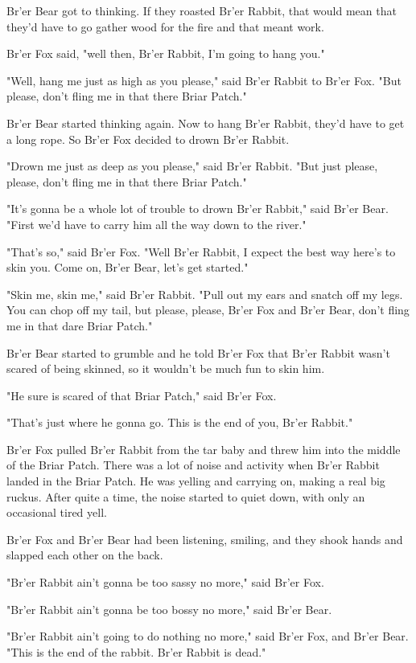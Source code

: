 Br'er Bear got to thinking. If they roasted Br'er Rabbit, that would mean that they'd have to go gather wood for the fire and that meant work.

Br'er Fox said, "well then, Br'er Rabbit, I'm going to hang you."

"Well, hang me just as high as you please," said Br'er Rabbit to Br'er Fox. "But please, don't fling me in that there Briar Patch."

Br'er Bear started thinking again. Now to hang Br'er Rabbit, they'd have to get a long rope. So Br'er Fox decided to drown Br'er Rabbit.

"Drown me just as deep as you please," said Br'er Rabbit. "But just please, please, don't fling me in that there Briar Patch."

"It's gonna be a whole lot of trouble to drown Br'er Rabbit," said Br'er Bear. "First we'd have to carry him all the way down to the river."

"That's so," said Br'er Fox. "Well Br'er Rabbit, I expect the best way here's to skin you. Come on, Br'er Bear, let's get started."

"Skin me, skin me," said Br'er Rabbit. "Pull out my ears and snatch off my legs. You can chop off my tail, but please, please, Br'er Fox and Br'er Bear, don't fling me in that dare Briar Patch."

Br'er Bear started to grumble and he told Br'er Fox that Br'er Rabbit wasn't scared of being skinned, so it wouldn't be much fun to skin him.

"He sure is scared of that Briar Patch," said Br'er Fox.

"That's just where he gonna go. This is the end of you, Br'er Rabbit."

Br'er Fox pulled Br'er Rabbit from the tar baby and threw him into the middle of the Briar Patch. There was a lot of noise and activity when Br'er Rabbit landed in the Briar Patch. He was yelling and carrying on, making a real big ruckus. After quite a time, the noise started to quiet down, with only an occasional tired yell.

Br'er Fox and Br'er Bear had been listening, smiling, and they shook hands and slapped each other on the back.

"Br'er Rabbit ain't gonna be too sassy no more," said Br'er Fox.

"Br'er Rabbit ain't gonna be too bossy no more," said Br'er Bear.

"Br'er Rabbit ain't going to do nothing no more," said Br'er Fox, and Br'er Bear. "This is the end of the rabbit. Br'er Rabbit is dead."

